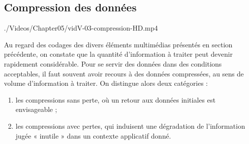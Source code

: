 \subsection[Compression]{Compression des données}
\label{sub:V.3.1}

\begin{marginvideo}%
		{./Videos/Chapter05/vidV-03-compression-HD.mp4}%
\end{marginvideo}

Au regard des codages des divers éléments multimédias présentés en section précédente, on constate que la quantité d'information à traiter peut devenir rapidement considérable. Pour se servir des données dans des conditions acceptables, il faut souvent avoir recours à des données compressées, au sens de volume d'information à traiter. On distingue alors deux catégories :
\begin{enumerate}
	\item les compressions sans perte, où un retour aux données initiales est envisageable ;
	\item les compressions avec pertes, qui induisent une dégradation de l'information jugée « inutile » dans un contexte applicatif donné.
\end{enumerate}

